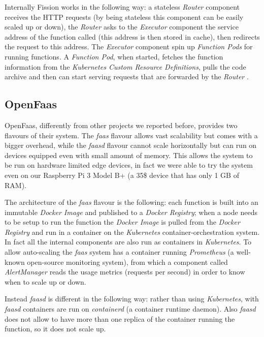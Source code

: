 Internally Fission works in the following way: a stateless \textit{Router} component receives the HTTP requests (by being stateless this component can be easily scaled up or down), the \textit{Router} asks to the \textit{Executor} component the service address of the function called (this address is then stored in cache), then redirects the request to this address. The \textit{Executor} component spin up \textit{Function Pods} for running functions. A \textit{Function Pod}, when started, fetches the function information from the \textit{Kubernetes Custom Resource Definitions}, pulls the code archive and then can start serving requests that are forwarded by the \textit{Router} \cite{fission-architecture}.


\subsection{OpenFaas}
OpenFaas, differently from other projects we reported before, provides two flavours of their system. The \textit{faas} flavour allows vast scalability but comes with a bigger overhead, while the \textit{faasd} flavour cannot scale horizontally but can run on devices equipped even with small amount of memory. This allows the system to be run on hardware limited edge devices, in fact we were able to try the system even on our Raspberry Pi 3 Model B+ (a 35\$ device that has only 1 GB of RAM).

The architecture of the \textit{faas} flavour is the following: each function is built into an immutable \textit{Docker Image} and published to a \textit{Docker Registry}; when a node needs to be setup to run the function the \textit{Docker Image} is pulled from the \textit{Docker Registry} and run in a container on the \textit{Kubernetes}  container-orchestration system. In fact all the internal components are also run as containers in \textit{Kubernetes}. To allow auto-scaling the \textit{faas} system has a container running \textit{Prometheus} (a well-known open-source monitoring system), from which a component called \textit{AlertManager} reads the usage metrics (requests per second) in order to know when to scale up or down.

Instead \textit{faasd} is different in the following way: rather than using \textit{Kubernetes}, with \textit{faasd} containers are run on \textit{containerd} (a container runtime daemon). Also \textit{faasd} does not allow to have more than one replica of the container running the function, so it does not scale up.


